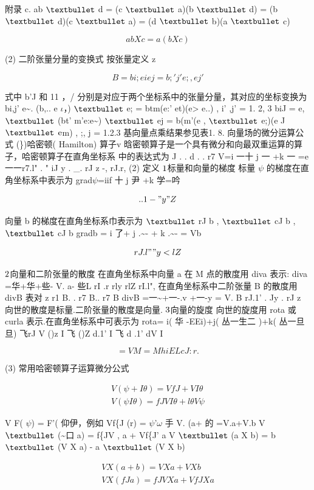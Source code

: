 附录 c. ab ${\rm •}$ d = (c ${\rm •}$ a)(b ${\rm •}$ d) = (b ${\rm •}$ d)(c ${\rm •}$ a) = (d ${\rm •}$ b)(a ${\rm •}$ c)

\[abXc=a(bXc)\]

(2) 二阶张量分量的变换式 按张量定义 z

\[B = bi;eie j = b;'j' e;, ej'\]

式中 b'J 和 11 ，/ 分别是对应于两个坐标系中的张量分量，其对应的坐标变换为 bi,j' e\textasciitilde{}. (b,.. e $\iota$，) ${\rm •}$ e; = btm(e:' et)(e> e..) , i' ,j' = 1. 2, 3 biJ = e, ${\rm •}$ (bt' m'e:e\textasciitilde{}) ${\rm •}$ ej = b(m'(e , ${\rm •}$ e;)(e J ${\rm •}$ ${\rm e}$m) , ;, j = 1.2.3 基向量点乘结果参见表1. 8. 向量场的微分运算公式 (\})哈密顿( Hamilton) 算子v 晗密顿算子是一个具有微分和向最双重运算的算子，哈密顿算子在直角坐标系 中的表达式为 J . . d . . r7 V=i 一十 j 一 +k 一 =e 一一r7.l" . " iJ y . \_. rJ z -, rJ.r, (2) 定义 ${\rm 1}$标量和向量的梯度 标量 $\psi$ 的梯度在直角坐标系中表示为 grad$\psi$=iif 十 j 尹 +k 学=吟

\[.  .1- "y "Z\]

向量 b 的梯度在直角坐标系巾表示为 ${\rm •}$ rJ b , ${\rm •}$ cJ b , ${\rm •}$ cJ b gradb = i 了+ j .\textasciitilde{}- + k .\textasciitilde{}- = Vb

\[rJ.l" "y <l Z\]

${\rm 2}$向量和二阶张量的散度 在直角坐标系中向量 a 在 M 点的散度用 diva 表示: diva =华+华+些- V. a- 些L rI .r rly rlZ rI.l", 在直角坐标系中二阶张量 B 的散度用 divB 表对 z r1 B. . r7 B.. r7 B divB =一\textasciitilde{}+一-.v +一-y = V. B rJ.1' . Jy . rJ z 向世的散度是标量.二阶张量的散度是向量. ${\rm 3}$向量的旋度 向世的旋度用 rota 或 curla 表示.在直角坐标系中可表示为 rota= i( 华 -EEi)+j( 丛一生二 )+k( 丛一旦旦) 飞rJ V ()z I 飞 ()Z d.1' I 飞 d .1' dV I

\[=VM=MhiEL cJ:r.\]

(3) 常用哈密顿算子运算微分公式

\begin{gather*}
V(\psi  + I\theta ) = VfJ +VI\theta \\
V(\psi  I\theta ) = fJ VI\theta  +l\theta V\psi 
\end{gather*}

V F( $\psi$) = F'( 仰伊，例如 Vf\{J (r) = $\psi$'$\omega$ 手 V. (a+ 的 =V.a+V.b V ${\rm •}$ (\textasciitilde{}口 a) = f\{JV , a + Vf\{J' a V ${\rm •}$ (a X b) = b ${\rm •}$ (V X a) - a ${\rm •}$ (V X b)

\begin{gather*}
V X (a + b) = V X a + V X b\\
V X (fJ a) = fJV X a + VfJ X a
\end{gather*}

